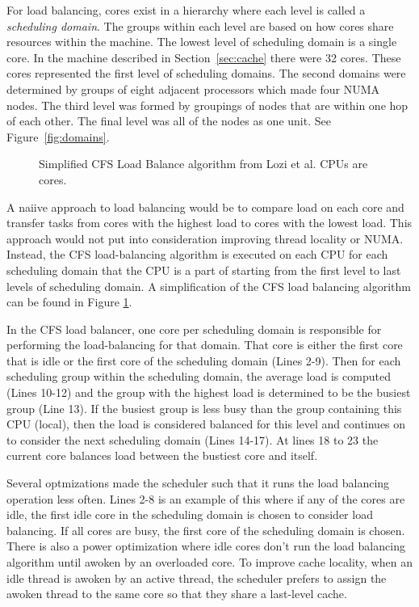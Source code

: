 \documentclass{sig-alternate}
\begin{document}
For load balancing, cores exist in a hierarchy where each level is called a \emph{scheduling domain}. The groups within each level are based on how cores share resources within the machine. The lowest level of scheduling domain is a single core. In the machine described in Section~\ref{sec:cache} there were 32 cores. These cores represented the first level of scheduling domains. The second domains were determined by groups of eight adjacent processors which made four NUMA nodes. The third level was formed by groupings of nodes that are within one hop of each other. The final level was all of the nodes as one unit. See Figure~\ref{fig:domains}.~\cite{Lozi:2016}

\begin{figure}
\centering
{}
\caption{Simplified CFS Load Balance algorithm from Lozi et al. CPUs are cores.~\cite{Lozi:2016}}
\label{fig:cfsloadbalancer}
\end{figure}

A naiive approach to load balancing would be to compare load on each core and transfer tasks from cores with the highest load to cores with the lowest load. This approach would not put into consideration improving thread locality or NUMA. Instead, the CFS load-balancing algorithm is executed on each CPU for each scheduling domain that the CPU is a part of starting from the first level to last levels of scheduling domain. A simplification of the CFS load balancing algorithm can be found in Figure \ref{fig:cfsloadbalancer}.

In the CFS load balancer, one core per scheduling domain is responsible for performing the load-balancing for that domain. That core is either the first core that is idle or the first core of the scheduling domain (Lines 2-9). Then for each scheduling group within the scheduling domain, the average load is computed (Lines 10-12) and the group with the highest load is determined to be the busiest group (Line 13). If the busiest group is less busy than the group containing this CPU (local), then the load is considered balanced for this level and continues on to consider the next scheduling domain (Lines 14-17). At lines 18 to 23 the current core balances load between the bustiest core and itself.~\cite{Lozi:2016}

Several optmizations made the scheduler such that it runs the load balancing operation less often. Lines 2-8 is an example of this where if any of the cores are idle, the first idle core in the scheduling domain is chosen to consider load balancing. If all cores are busy, the first core of the scheduling domain is chosen. There is also a power optimization where idle cores don't run the load balancing algorithm until awoken by an overloaded core. To improve cache locality, when an idle thread is awoken by an active thread, the scheduler prefers to assign the awoken thread to the same core so that they share a last-level cache.~\cite{Lozi:2016}
\end{document}
